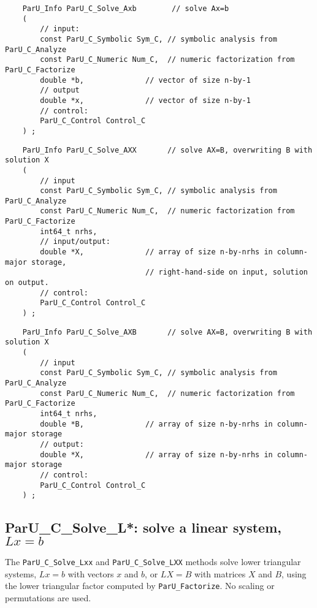 \documentclass[12pt]{article}
\begin{document}
    {\footnotesize
    \begin{verbatim}
    ParU_Info ParU_C_Solve_Axb        // solve Ax=b
    (
        // input:
        const ParU_C_Symbolic Sym_C, // symbolic analysis from ParU_C_Analyze
        const ParU_C_Numeric Num_C,  // numeric factorization from ParU_C_Factorize
        double *b,              // vector of size n-by-1
        // output
        double *x,              // vector of size n-by-1
        // control:
        ParU_C_Control Control_C
    ) ; \end{verbatim} }

    {\footnotesize
    \begin{verbatim}
    ParU_Info ParU_C_Solve_AXX       // solve AX=B, overwriting B with solution X
    (
        // input
        const ParU_C_Symbolic Sym_C, // symbolic analysis from ParU_C_Analyze
        const ParU_C_Numeric Num_C,  // numeric factorization from ParU_C_Factorize
        int64_t nrhs,
        // input/output:
        double *X,              // array of size n-by-nrhs in column-major storage,
                                // right-hand-side on input, solution on output.
        // control:
        ParU_C_Control Control_C
    ) ; \end{verbatim} }

    {\footnotesize
    \begin{verbatim}
    ParU_Info ParU_C_Solve_AXB       // solve AX=B, overwriting B with solution X
    (
        // input
        const ParU_C_Symbolic Sym_C, // symbolic analysis from ParU_C_Analyze
        const ParU_C_Numeric Num_C,  // numeric factorization from ParU_C_Factorize
        int64_t nrhs,
        double *B,              // array of size n-by-nrhs in column-major storage
        // output:
        double *X,              // array of size n-by-nrhs in column-major storage
        // control:
        ParU_C_Control Control_C
    ) ; \end{verbatim} }

\subsection{{\sf ParU\_C\_Solve\_L*}: solve a linear system, $Lx=b$}

    The \verb'ParU_C_Solve_Lxx' and \verb'ParU_C_Solve_LXX' methods solve lower
    triangular systems, $Lx=b$ with vectors $x$ and $b$, or $LX=B$ with
    matrices $X$ and $B$, using the lower triangular factor computed by
    \verb'ParU_Factorize'.  No scaling or permutations are used.
\end{document}
